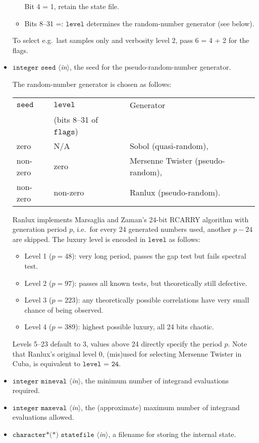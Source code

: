 \documentclass[12pt]{article}
\newcommand\ie{i.e.\ }
\newcommand\eg{e.g.\ }
\newcommand\Code[1]{\ensuremath{\texttt{#1}}}
\newcommand\VarIn[1]{\item\Code{#1} \textit{$\langle$in\/$\rangle$},}
\begin{document}
\begin{itemize}
\begin{itemize}
Bit 4 = 1,
retain the state file.

\item Bits 8--31 =: \Code{level} determines the random-number generator
(see below).
\end{itemize}

To select \eg last samples only and verbosity level 2, pass 6 = 4 + 2
for the flags.

\VarIn{integer seed}
the seed for the pseudo-random-number generator.

The random-number generator is chosen as follows:
\begin{center}
\begin{tabular}{l|l|l}
\Code{seed} & \Code{level} & Generator \\
& {\small (bits 8--31 of \Code{flags})} & \\ \hline
zero & N/A & Sobol (quasi-random), \\
non-zero & zero & Mersenne Twister (pseudo-random), \\
non-zero & non-zero & Ranlux (pseudo-random).
\end{tabular}
\end{center}

Ranlux implements Marsaglia and Zaman's 24-bit RCARRY algorithm with
generation period $p$, \ie for every 24 generated numbers used, another
$p - 24$ are skipped.  The luxury level is encoded in \Code{level} as
follows:
\begin{itemize}
\item Level 1 ($p = 48$):
	very long period, passes the gap test but fails spectral test.
\item Level 2 ($p = 97$):
	passes all known tests, but theoretically still defective.
\item Level 3 ($p = 223$):
	any theoretically possible correlations have very small 
	chance of being observed.
\item Level 4 ($p = 389$):
	highest possible luxury, all 24 bits chaotic.
\end{itemize}
Levels 5--23 default to 3, values above 24 directly specify the period
$p$.  Note that Ranlux's original level 0, (mis)used for selecting
Mersenne Twister in Cuba, is equivalent to \Code{level = 24}.

\VarIn{integer mineval}
the minimum number of integrand evaluations required.

\VarIn{integer maxeval}
the (approximate) maximum number of integrand evaluations allowed.

\VarIn{character*(*) statefile}
a filename for storing the internal state.


\end{itemize}
\end{document}
